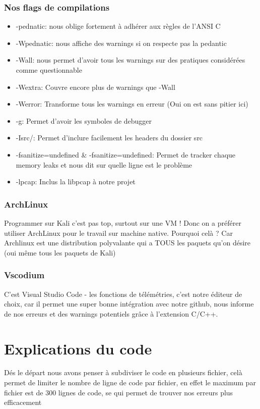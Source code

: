 \documentclass[a4paper]{report}
\begin{document}
\section{Nos flags de compilations}
\label{sec:org78faf0b}
\begin{itemize}
\item -pednatic: nous oblige fortement à adhérer aux règles de l'ANSI C
\item -Wpednatic: nous affiche des warnings si on respecte pas la pedantic
\item -Wall: nous permet d'avoir tous les warnings sur des pratiques considérées comme questionnable
\item -Wextra: Couvre encore plus de warnings que -Wall
\item -Werror: Transforme tous les warnings en erreur (Oui on est sans pitier ici)
\item -g: Permet d'avoir les symboles de debugger
\item -Isrc/: Permet d'inclure facilement les headers du dossier src
\item -fsanitize=undefined \& -fsanitize=undefined: Permet de tracker chaque memory leaks et nous dit sur quelle ligne est le problème
\item -lpcap: Inclus la libpcap à notre projet
\end{itemize}

\section{ArchLinux}
\label{sec:org8bc032b}
Programmer sur Kali c'est pas top, surtout sur une VM ! Donc on a préférer utiliser ArchLinux pour le travail sur machine native.
Pourquoi celà ? Car Archlinux est une distribution polyvalante qui a TOUS les paquets qu'on désire (oui même tous les paquets de Kali)
\section{Vscodium}
\label{sec:org6388911}
C'est Visual Studio Code - les fonctions de télémétries, c'est notre éditeur de choix, car il permet une super bonne intégration avec notre github,
nous informe de nos erreurs et des warnings potentiels grâce à l'extension C/C++.
\part{Explications du code}
\label{sec:org809e1a5}
Dés le départ nous avons penser à subdiviser le code en plusieurs fichier, celà permet de limiter le nombre de ligne de code
par fichier, en effet le maximum par fichier est de 300 lignes de code, se qui permet de trouver nos erreurs plus efficacement
\end{document}
